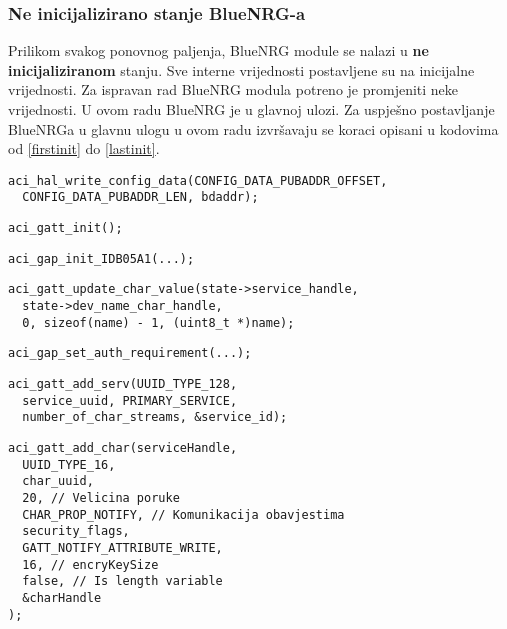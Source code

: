 \documentclass[times, utf8, diplomski]{diplomski}
\begin{document}
\subsubsection{Ne inicijalizirano stanje BlueNRG-a}
Prilikom svakog ponovnog paljenja, BlueNRG module se nalazi u \textbf{ne inicijaliziranom} stanju. Sve interne vrijednosti postavljene su na inicijalne vrijednosti. Za ispravan rad BlueNRG modula potreno je promjeniti neke vrijednosti. U ovom radu BlueNRG je u glavnoj ulozi. Za uspješno postavljanje BlueNRGa u glavnu ulogu u ovom radu izvršavaju se koraci opisani u kodovima od \ref{firstinit} do \ref{lastinit}.

\begin{lstlisting}[caption={Postavi MAC adresu}, label={firstinit}]
aci_hal_write_config_data(CONFIG_DATA_PUBADDR_OFFSET,
  CONFIG_DATA_PUBADDR_LEN, bdaddr);
\end{lstlisting}

\begin{lstlisting}[caption={Inicijaliziraj gatt podsustav}]
aci_gatt_init();
\end{lstlisting}

\begin{lstlisting}[caption={Inicijaliziraj gap podsustav}]
aci_gap_init_IDB05A1(...);
\end{lstlisting}

\begin{lstlisting}[caption={Postavi ime kojim će se predstavljati ostalim bluetooth uređajima.}]
aci_gatt_update_char_value(state->service_handle,
  state->dev_name_char_handle,
  0, sizeof(name) - 1, (uint8_t *)name);
\end{lstlisting}

\begin{lstlisting}[caption={Postavi autentifikacijske zahtjeve}]
aci_gap_set_auth_requirement(...);
\end{lstlisting}

\begin{lstlisting}[caption={Postavljanje sevisa koji sadrži karakteristične tokve}]
aci_gatt_add_serv(UUID_TYPE_128,
  service_uuid, PRIMARY_SERVICE,
  number_of_char_streams, &service_id);
\end{lstlisting}

\begin{lstlisting}[caption={Postavljanje karakterističnih tokova}]
aci_gatt_add_char(serviceHandle,
  UUID_TYPE_16,
  char_uuid,
  20, // Velicina poruke
  CHAR_PROP_NOTIFY, // Komunikacija obavjestima
  security_flags,
  GATT_NOTIFY_ATTRIBUTE_WRITE,
  16, // encryKeySize
  false, // Is length variable
  &charHandle
);
\end{lstlisting}
\end{document}
